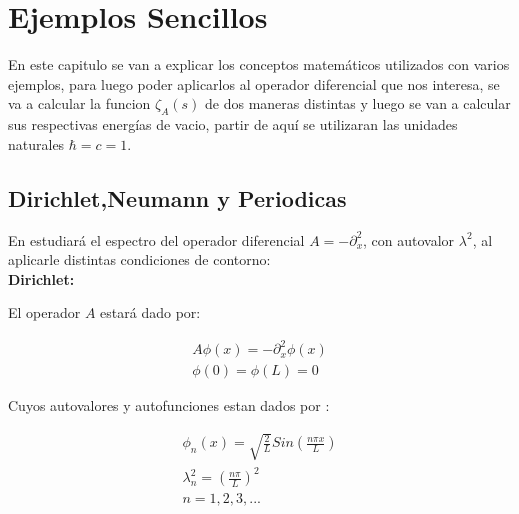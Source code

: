 \chapter{Ejemplos Sencillos}

    
    En este capitulo se van a explicar los conceptos matemáticos utilizados con varios ejemplos, para luego poder aplicarlos al operador diferencial que nos interesa, se va a calcular la funcion $ \zeta _A (s) $ de dos maneras distintas y luego se van a calcular sus respectivas energías de vacio, partir de aquí se utilizaran las unidades naturales $\hbar=c=1$.

\section{Dirichlet,Neumann y Periodicas}

En estudiará el espectro del operador diferencial $A = - \partial ^2 _x$, con autovalor $\lambda ^2$, al aplicarle distintas condiciones de contorno: \\

\textbf{Dirichlet:}

El operador $A$ estará dado por:

\begin{equation}
\begin{array}{c}
	A \phi (x) = - \partial _x ^2 \phi (x) \\
    \phi (0) = \phi(L) = 0 
\end{array}
\end{equation}



Cuyos autovalores y autofunciones estan dados por  : 

\begin{equation}
\begin{array}{c}
	\phi _n (x) = \sqrt{\frac{2}{L}} Sin( \frac{n \pi x}{L} ) \\
	\lambda _n ^2 = \left( \frac{n \pi }{L} \right) ^2 \\
	n = 1,2,3, ...
\end{array}
\end{equation}

